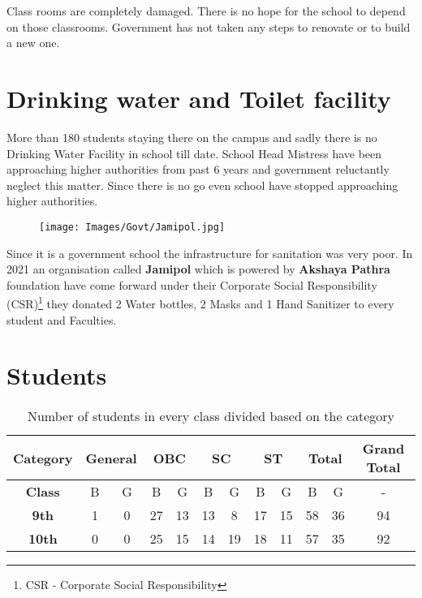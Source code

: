 Class rooms are completely damaged. There is no hope for the school to depend on those classrooms. Government has not taken any steps to renovate or to build a new one. 

\section{Drinking water and Toilet facility}
More than 180 students staying there on the campus and sadly there is no Drinking Water Facility in school till date. School Head Mistress have been approaching higher authorities from past 6 years and government reluctantly neglect this matter. Since there is no go even school have stopped approaching higher authorities.\\

\begin{figure}[H]
    \centering
    \texttt{[image: Images/Govt/Jamipol.jpg]}
\end{figure}

Since it is a government school the infrastructure for sanitation was very poor. In 2021 an organisation called \textbf{Jamipol} which is powered by \textbf{Akshaya Pathra} foundation have come forward under their Corporate Social Responsibility (CSR)\footnote{CSR - Corporate Social Responsibility} they donated 2 Water bottles, 2 Masks and 1 Hand Sanitizer to every student and Faculties.   

\section{Students}
\begin{table}[H]
    \centering
    \begin{tabular}{|c|c|c|c|c|c|c|c|c|c|c|c|} \hline
        \textbf{Category} & \multicolumn{2}{c|}{\textbf{General}} & \multicolumn{2}{c|}{\textbf{OBC}} & \multicolumn{2}{c|}{\textbf{SC}} & \multicolumn{2}{c|}{\textbf{ST}} & \multicolumn{2}{c|}{\textbf{Total}} & \textbf{Grand Total} \\ \hline
         \textbf{Class} & B & G & B & G & B & G & B & G & B & G & - \\ \hline
         \textbf{9th} & 1 & 0 & 27 & 13 & 13 & 8 & 17 & 15 & 58 & 36 & 94\\ \hline
         \textbf{10th} & 0 & 0 & 25 & 15 & 14 & 19 & 18 & 11 & 57 & 35 & 92 \\ \hline 
    \end{tabular}
    \caption*{Number of students in every class divided based on the category}
\end{table}

